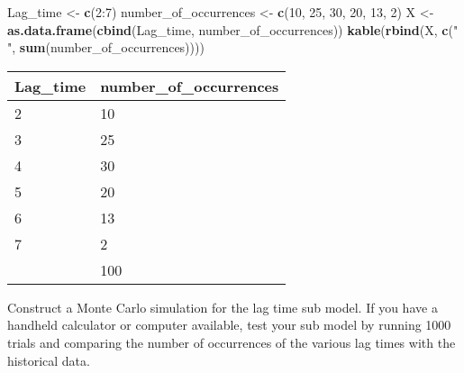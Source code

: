 \documentclass[]{article}
\newenvironment{Shaded}{\begin{snugshade}}{\end{snugshade}}
\newcommand{\KeywordTok}[1]{\textcolor[rgb]{0.13,0.29,0.53}{\textbf{{#1}}}}
\newcommand{\DecValTok}[1]{\textcolor[rgb]{0.00,0.00,0.81}{{#1}}}
\newcommand{\StringTok}[1]{\textcolor[rgb]{0.31,0.60,0.02}{{#1}}}
\newcommand{\NormalTok}[1]{{#1}}
\begin{document}
\begin{Shaded}
\begin{Highlighting}[]
\NormalTok{Lag_time <-}\StringTok{ }\KeywordTok{c}\NormalTok{(}\DecValTok{2}\NormalTok{:}\DecValTok{7}\NormalTok{)}
\NormalTok{number_of_occurrences <-}\StringTok{ }\KeywordTok{c}\NormalTok{(}\DecValTok{10}\NormalTok{, }\DecValTok{25}\NormalTok{, }\DecValTok{30}\NormalTok{, }\DecValTok{20}\NormalTok{, }\DecValTok{13}\NormalTok{, }\DecValTok{2}\NormalTok{)}
\NormalTok{X <-}\StringTok{ }\KeywordTok{as.data.frame}\NormalTok{(}\KeywordTok{cbind}\NormalTok{(Lag_time, number_of_occurrences))}
\KeywordTok{kable}\NormalTok{(}\KeywordTok{rbind}\NormalTok{(X, }\KeywordTok{c}\NormalTok{(}\StringTok{" "}\NormalTok{, }\KeywordTok{sum}\NormalTok{(number_of_occurrences))))}
\end{Highlighting}
\end{Shaded}

\begin{longtable}[]{@{}ll@{}}
\toprule
Lag\_time & number\_of\_occurrences\tabularnewline
\midrule
\endhead
2 & 10\tabularnewline
3 & 25\tabularnewline
4 & 30\tabularnewline
5 & 20\tabularnewline
6 & 13\tabularnewline
7 & 2\tabularnewline
& 100\tabularnewline
\bottomrule
\end{longtable}

Construct a Monte Carlo simulation for the lag time sub model. If you
have a handheld calculator or computer available, test your sub model by
running 1000 trials and comparing the number of occurrences of the
various lag times with the historical data.
\end{document}
